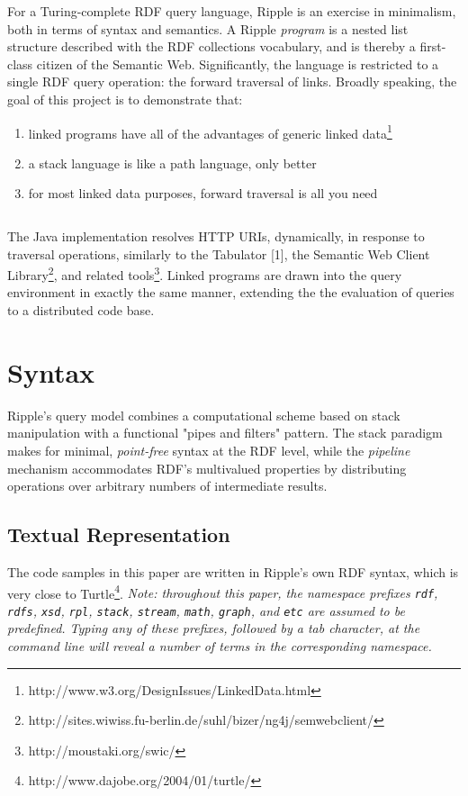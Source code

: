 \documentclass[runningheads]{llncs}
\begin{document}
For a Turing-complete RDF query language, Ripple is an exercise in minimalism, both in terms of syntax and semantics.  A Ripple \textit{program} is a nested list structure described with the RDF collections vocabulary, and is thereby a first-class citizen of the Semantic Web.  Significantly, the language is restricted to a single RDF query operation: the forward traversal of links.  Broadly speaking, the goal of this project is to demonstrate that:
\begin{enumerate}
\item linked programs have all of the advantages of generic linked data\footnote{http://www.w3.org/DesignIssues/LinkedData.html}
\item a stack language is like a path language, only better
\item for most linked data purposes, forward traversal is all you need
\end{enumerate}

\begin{verbatim}
\end{verbatim}

The Java implementation resolves HTTP URIs, dynamically, in response to traversal operations, similarly to the Tabulator [1], the Semantic Web Client Library\footnote{http://sites.wiwiss.fu-berlin.de/suhl/bizer/ng4j/semwebclient/}, and related tools\footnote{http://moustaki.org/swic/}.  Linked programs are drawn into the query environment in exactly the same manner, extending the the evaluation of queries to a distributed code base.


\section{Syntax}

Ripple's query model combines a computational scheme based on stack manipulation with a functional "pipes and filters" pattern.  The stack paradigm makes for minimal, \textit{point-free} syntax at the RDF level, while the \textit{pipeline} mechanism accommodates RDF's multivalued properties by distributing operations over arbitrary numbers of intermediate results.

\subsection{Textual Representation}
The code samples in this paper are written in Ripple's own RDF syntax, which is very close to Turtle\footnote{http://www.dajobe.org/2004/01/turtle/}.
\newline
\textit{Note: throughout this paper, the namespace prefixes \texttt{rdf}, \texttt{rdfs}, \texttt{xsd}, \texttt{rpl}, \texttt{stack}, \texttt{stream}, \texttt{math}, \texttt{graph}, and \texttt{etc} are assumed to be predefined.  Typing any of these prefixes, followed by a tab character, at the command line will reveal a number of terms in the corresponding namespace.}
\newline
\end{document}
